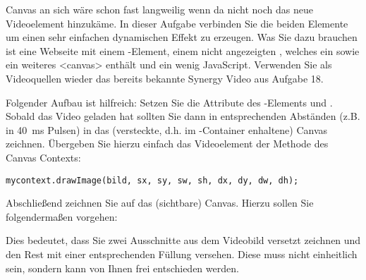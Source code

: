 %
\par Canvas an sich wäre schon fast langweilig wenn da nicht noch das neue Videoelement hinzukäme. In dieser Aufgabe verbinden Sie die beiden Elemente um einen sehr einfachen dynamischen Effekt zu erzeugen. Was Sie dazu brauchen ist eine Webseite mit einem -Element, einem nicht angezeigten  , welches ein  sowie ein weiteres <canvas> enthält und ein wenig JavaScript. Verwenden Sie als Videoquellen wieder das bereits bekannte Synergy Video aus Aufgabe 18.
%
\par Folgender Aufbau ist hilfreich: Setzen Sie die Attribute des -Elements  und . Sobald das Video geladen hat sollten Sie dann in entsprechenden Abständen (z.B. in \qty{40}{ms} Pulsen) in das (versteckte, d.h. im -Container enhaltene) Canvas zeichnen. Übergeben Sie hierzu einfach das Videoelement der  Methode des Canvas Contexts:
%
\begin{lstlisting}
mycontext.drawImage(bild, sx, sy, sw, sh, dx, dy, dw, dh);
\end{lstlisting}
%
\par Abschließend zeichnen Sie auf das (sichtbare) Canvas. Hierzu sollen Sie folgendermaßen vorgehen:
%


\par Dies bedeutet, dass Sie zwei Ausschnitte aus dem Videobild versetzt zeichnen und den Rest mit einer entsprechenden Füllung versehen. Diese muss nicht einheitlich sein, sondern kann von Ihnen frei entschieden werden.